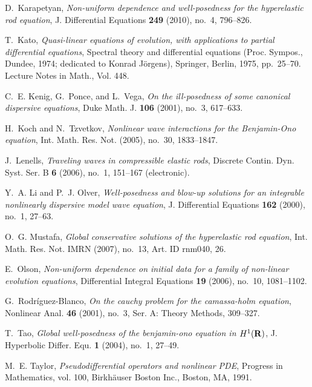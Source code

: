\documentclass[12pt,oneside,reqno]{amsbook}
\numberwithin{equation}{section}
\begin{document}
\begin{thebibliography}{100}
D.~Karapetyan, \emph{Non-uniform dependence and well-posedness for the
  hyperelastic rod equation}, J. Differential Equations \textbf{249} (2010),
  no.~4, 796--826.

T.~Kato, \emph{Quasi-linear equations of evolution, with applications to
  partial differential equations}, Spectral theory and differential equations
  ({P}roc. {S}ympos., {D}undee, 1974; dedicated to {K}onrad {J}{\"o}rgens),
  Springer, Berlin, 1975, pp.~25--70. Lecture Notes in Math., Vol. 448.
  

C.~E. Kenig, G.~Ponce, and L.~Vega, \emph{On the ill-posedness of some
  canonical dispersive equations}, Duke Math. J. \textbf{106} (2001), no.~3,
  617--633.

H.~Koch and N.~Tzvetkov, \emph{Nonlinear wave interactions for the
  {B}enjamin-{O}no equation}, Int. Math. Res. Not. (2005), no.~30, 1833--1847.
  

J.~Lenells, \emph{Traveling waves in compressible elastic rods}, Discrete
  Contin. Dyn. Syst. Ser. B \textbf{6} (2006), no.~1, 151--167 (electronic).

Y.~A. Li and P.~J. Olver, \emph{Well-posedness and blow-up solutions for an
  integrable nonlinearly dispersive model wave equation}, J. Differential
  Equations \textbf{162} (2000), no.~1, 27--63.

O.~G. Mustafa, \emph{Global conservative solutions of the hyperelastic rod
  equation}, Int. Math. Res. Not. IMRN (2007), no.~13, Art. ID rnm040, 26.
  

E.~Olson, \emph{Non-uniform dependence on initial data for a family of
  non-linear evolution equations}, Differential Integral Equations \textbf{19}
  (2006), no.~10, 1081--1102.

G.~Rodr\'iguez-Blanco, \emph{On the cauchy problem for the camassa-holm
  equation}, Nonlinear Anal. \textbf{46} (2001), no.~3, Ser. A: Theory Methods,
  309--327.

T.~Tao, \emph{Global well-posedness of the benjamin-ono equation in $H^1(\bf
  R)$}, J. Hyperbolic Differ. Equ. \textbf{1} (2004), no.~1, 27--49.

M.~E. Taylor, \emph{Pseudodifferential operators and nonlinear {PDE}}, Progress
  in Mathematics, vol. 100, Birkh{\"a}user Boston Inc., Boston, MA, 1991.
  


\end{thebibliography}
\end{document}
